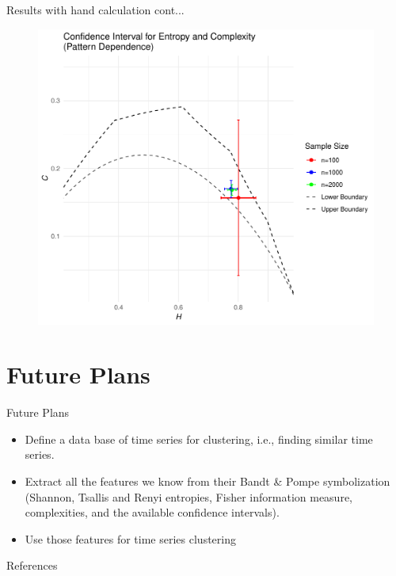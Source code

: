 \documentclass{beamer}
\begin{document}
\begin{frame}{Results with hand calculation cont...}
	\begin{figure}[hbt]
		\centering
		\includegraphics[width=0.7 \textwidth]{CI for pattern dependence}
		\end{figure}
\end{frame}


\section{Future Plans}

\begin{frame}{Future Plans}
    \begin{itemize}
        \item Define a data base of time series for clustering, i.e., finding similar time series.
        \item Extract all the features we know from their Bandt \& Pompe symbolization (Shannon, Tsallis and Renyi entropies, Fisher information measure, complexities, and the available confidence intervals).
        \item Use those features for time series clustering
    \end{itemize}
\end{frame}

\begin{frame}[allowframebreaks]{References}
    
    
    
\end{frame}
\end{document}
